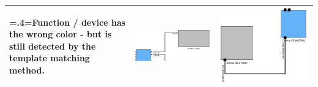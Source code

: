\begin{table}[H]
\begin{tabularx}{\textwidth}{@{}>{\hsize=.4\hsize\linewidth=\hsize}X m{} m{}@{}}
        \midrule
        Function / device has the wrong color - but is still detected by the template matching method. &  
        \includegraphics[width=\linewidth]{pictures/one_in_grey_input_clip.png} & 
        \includegraphics[width=\linewidth]{pictures/one_in_blue_input_clip.png} \\
        \bottomrule
    \end{tabularx}
\end{table}